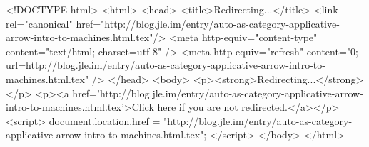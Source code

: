 <!DOCTYPE html>
<html>
<head>
<title>Redirecting...</title>
<link rel="canonical" href="http://blog.jle.im/entry/auto-as-category-applicative-arrow-intro-to-machines.html.tex"/>
<meta http-equiv="content-type" content="text/html; charset=utf-8" />
<meta http-equiv="refresh" content="0; url=http://blog.jle.im/entry/auto-as-category-applicative-arrow-intro-to-machines.html.tex" />
</head>
<body>
  <p><strong>Redirecting...</strong></p>
  <p><a href='http://blog.jle.im/entry/auto-as-category-applicative-arrow-intro-to-machines.html.tex'>Click here if you are not redirected.</a></p>
  <script>
    document.location.href = "http://blog.jle.im/entry/auto-as-category-applicative-arrow-intro-to-machines.html.tex";
  </script>
</body>
</html>
